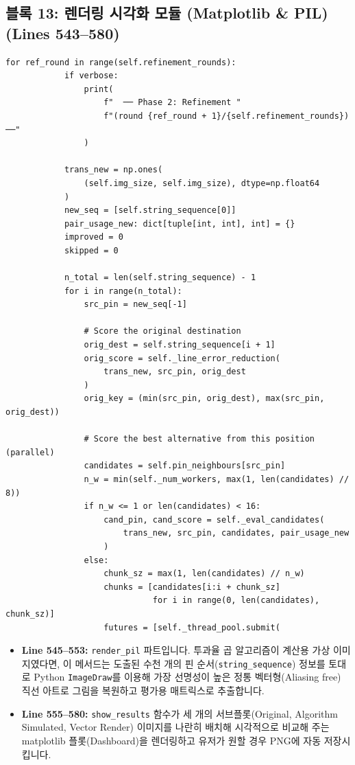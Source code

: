 \subsection*{블록 13: 렌더링 시각화 모듈 (Matplotlib & PIL) (Lines 543--580)}
\begin{lstlisting}[firstnumber=543]
        for ref_round in range(self.refinement_rounds):
            if verbose:
                print(
                    f"  ── Phase 2: Refinement "
                    f"(round {ref_round + 1}/{self.refinement_rounds}) ──"
                )

            trans_new = np.ones(
                (self.img_size, self.img_size), dtype=np.float64
            )
            new_seq = [self.string_sequence[0]]
            pair_usage_new: dict[tuple[int, int], int] = {}
            improved = 0
            skipped = 0

            n_total = len(self.string_sequence) - 1
            for i in range(n_total):
                src_pin = new_seq[-1]

                # Score the original destination
                orig_dest = self.string_sequence[i + 1]
                orig_score = self._line_error_reduction(
                    trans_new, src_pin, orig_dest
                )
                orig_key = (min(src_pin, orig_dest), max(src_pin, orig_dest))

                # Score the best alternative from this position (parallel)
                candidates = self.pin_neighbours[src_pin]
                n_w = min(self._num_workers, max(1, len(candidates) // 8))
                if n_w <= 1 or len(candidates) < 16:
                    cand_pin, cand_score = self._eval_candidates(
                        trans_new, src_pin, candidates, pair_usage_new
                    )
                else:
                    chunk_sz = max(1, len(candidates) // n_w)
                    chunks = [candidates[i:i + chunk_sz]
                              for i in range(0, len(candidates), chunk_sz)]
                    futures = [self._thread_pool.submit(
\end{lstlisting}
\begin{itemize}
\item \textbf{Line 545--553:} \texttt{render\_pil} 파트입니다. 투과율 곱 알고리즘이 계산용 가상 이미지였다면, 이 메서드는 도출된 수천 개의 핀 순서(\texttt{string\_sequence}) 정보를 토대로 Python \texttt{ImageDraw}를 이용해 가장 선명성이 높은 정통 벡터형(Aliasing free) 직선 아트로 그림을 복원하고 평가용 매트릭스로 추출합니다.
\item \textbf{Line 555--580:} \texttt{show\_results} 함수가 세 개의 서브플롯(Original, Algorithm Simulated, Vector Render) 이미지를 나란히 배치해 시각적으로 비교해 주는 matplotlib 플롯(Dashboard)을 렌더링하고 유저가 원할 경우 PNG에 자동 저장시킵니다.
\end{itemize}

